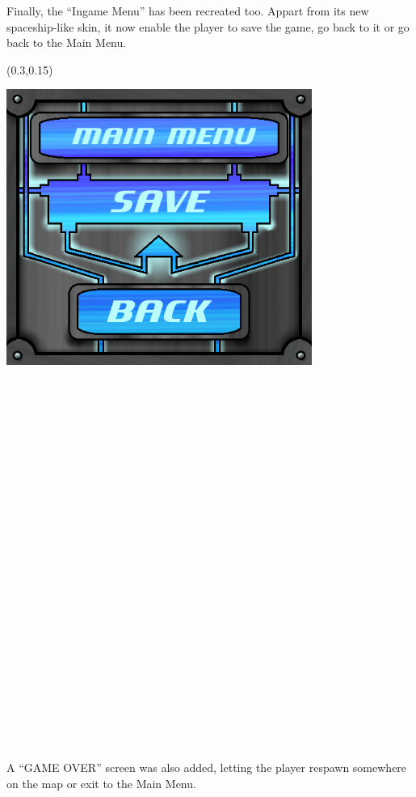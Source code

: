 \documentclass[article]{report}         %
\begin{document}
    \newpage

    Finally, the ``Ingame Menu'' has been recreated too. Appart from its new spaceship-like skin, it now enable the player to save the game, go back to it or go back to the Main Menu.\\

    \begin{textblock}{0.6}(0.3,0.15)
    
    \includegraphics[width=10cm, height=9cm]{images/Menus/ingame_menu_normal.png}
    
    \end{textblock}

      ~\\~\\~\\~\\~\\~\\~\\~\\~\\~\\~\\~\\~\\~\\~\\~\\~\\~\\~\\~\\~\\~\\~\\~\\

    A ``GAME OVER'' screen was also added, letting the player respawn somewhere on the map or exit to the Main Menu.\\
\end{document}
